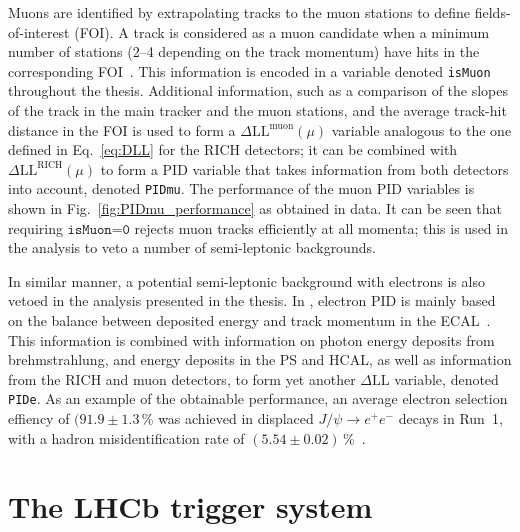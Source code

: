 Muons are identified by extrapolating tracks to the muon stations to define fields-of-interest (FOI). A track is considered as a muon candidate when a minimum number of stations (2--4 depending on the track momentum) have hits in the corresponding FOI~\cite{MuonPID,MuonPID2}. This information is encoded in a variable denoted \texttt{isMuon} throughout the thesis. Additional information, such as a comparison of the slopes of the track in the main tracker and the muon stations, and the average track-hit distance in the FOI is used to form a $\Delta \text{LL}^\text{muon}(\mu)$ variable analogous to the one defined in Eq.~\eqref{eq:DLL} for the RICH detectors; it can be combined with $\Delta \text{LL}^\text{RICH}(\mu)$ to form a PID variable that takes information from both detectors into account, denoted \texttt{PIDmu}. The performance of the muon PID variables is shown in Fig.~\ref{fig:PIDmu_performance} as obtained in data. It can be seen that requiring $\texttt{isMuon=0}$ rejects muon tracks efficiently at all momenta; this is used in the analysis to veto a number of semi-leptonic backgrounds.

In similar manner, a potential semi-leptonic background with electrons is also vetoed in the analysis presented in the thesis. In \lhcb, electron PID is mainly based on the balance between deposited energy and track momentum in the ECAL~\cite{ElectronPID}. This information is combined with information on photon energy deposits from brehmstrahlung, and energy deposits in the PS and HCAL, as well as information from the RICH and muon detectors, to form yet another $\Delta\text{LL}$ variable, denoted \texttt{PIDe}. As an example of the obtainable performance, an average electron selection effiency of $(91.9\pm1.3$\,\% was achieved in displaced $J/\psi\to e^+e^-$ decays in Run~1, with a hadron misidentification rate of $(5.54\pm0.02)$\,\%~\cite{LHCb-Performance}.



\section{The LHCb trigger system} %
\label{sec:the_lhcb_triggerring_system}

